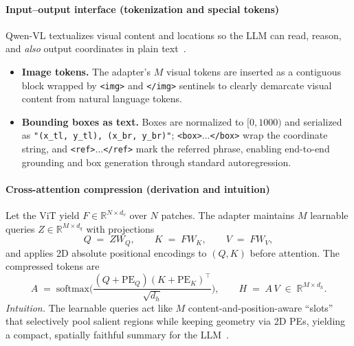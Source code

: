 \begin{enrichment}
\begin{enrichment}
        \paragraph{Input\mbox{--}output interface (tokenization and special tokens)}
        Qwen\mbox{-}VL textualizes visual content and locations so the LLM can read, reason, and \emph{also} output coordinates in plain text~\cite{bai2023_qwenvl}.
        \begin{itemize}
            \item \textbf{Image tokens.} The adapter’s $M$ visual tokens are inserted as a contiguous block wrapped by \texttt{<img>} and \texttt{</img>} sentinels to clearly demarcate visual content from natural language tokens.
            \item \textbf{Bounding boxes as text.} Boxes are normalized to $[0,1000)$ and serialized as \texttt{"(x\_tl, y\_tl), (x\_br, y\_br)"}; \texttt{<box>}...\texttt{</box>} wrap the coordinate string, and \texttt{<ref>}...\texttt{</ref>} mark the referred phrase, enabling end\mbox{-}to\mbox{-}end grounding and box generation through standard autoregression.
        \end{itemize}
        
        \paragraph{Cross\mbox{-}attention compression (derivation and intuition)}
        Let the ViT yield $F\!\in\!\mathbb{R}^{N\times d_v}$ over $N$ patches. The adapter maintains $M$ learnable queries $Z\!\in\!\mathbb{R}^{M\times d_q}$ with projections
        \[
        Q \;=\; ZW_Q,\qquad K \;=\; FW_K,\qquad V \;=\; FW_V,
        \]
        and applies 2D absolute positional encodings to $(Q,K)$ before attention. The compressed tokens are
        \[
        A \;=\; \mathrm{softmax}\!\Big(\frac{(Q{+}\mathrm{PE}_Q)(K{+}\mathrm{PE}_K)^\top}{\sqrt{d_h}}\Big),\qquad
        H \;=\; A\,V \;\in\; \mathbb{R}^{M\times d_h}.
        \]
        \emph{Intuition.} The learnable queries act like $M$ content\mbox{-}and\mbox{-}position\mbox{-}aware “slots” that selectively pool salient regions while keeping geometry via 2D PEs, yielding a compact, spatially faithful summary for the LLM~\cite{bai2023_qwenvl}.
        

\end{enrichment}
\end{enrichment}
